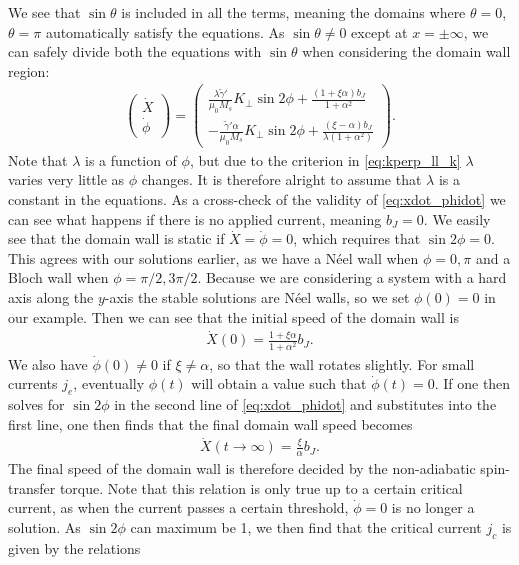\documentclass[12pt, a4paper]{article}		%
\numberwithin{equation}{section}
\begin{document}
We see that $\sin\theta$ is included in all the terms, meaning the domains where $\theta = 0$, $\theta = \pi$ automatically satisfy the equations. As $\sin\theta \neq 0$ except at $x = \pm \infty$, we can safely divide both the equations with $\sin\theta$ when considering the domain wall region:
\begin{align}
\label{eq:xdot_phidot}
\begin{pmatrix}
\dot{X} \\ \dot{\phi}
\end{pmatrix}
=
\begin{pmatrix}
\frac{\lambda \tilde{\gamma}'}{\mu_0 M_s} K_{\perp} \sin2\phi + \frac{(1+\xi\alpha)b_J}{1+\alpha^2} \\
-\frac{\tilde{\gamma}'\alpha}{\mu_0 M_s} K_{\perp} \sin2\phi + \frac{(\xi-\alpha)b_J}{\lambda(1+\alpha^2)}
\end{pmatrix}.
\end{align}
Note that $\lambda$ is a function of $\phi$, but due to the criterion in \eqref{eq:kperp_ll_k} $\lambda$ varies very little as $\phi$ changes. It is therefore alright to assume that $\lambda$ is a constant in the equations. As a cross-check of the validity of \eqref{eq:xdot_phidot} we can see what happens if there is no applied current, meaning $b_J = 0$. We easily see that the domain wall is static if $\dot{X} = \dot{\phi} = 0$, which requires that $\sin2\phi = 0$. This agrees with our solutions earlier, as we have a N\'{e}el wall when $\phi = 0, \pi$ and a Bloch wall when $\phi = \pi/2, 3\pi/2$. Because we are considering a system with a hard axis along the $y$-axis the stable solutions are N\'{e}el walls, so we set $\phi(0) = 0$ in our example. Then we can see that the initial speed of the domain wall is
\begin{align}
\label{eq:Xdot0}
\dot{X}(0) = \frac{1+\xi\alpha}{1+\alpha^2}b_J.
\end{align}
We also have $\dot{\phi}(0) \neq 0$ if $\xi \neq \alpha$, so that the wall rotates slightly. For small currents $j_e$, eventually $\phi(t)$ will obtain a value such that $\dot{\phi}(t) = 0$. If one then solves for $\sin2\phi$ in the second line of \eqref{eq:xdot_phidot} and substitutes into the first line, one then finds that the final domain wall speed becomes
\begin{align}
\label{eq:xdot_undercrit}
\dot{X}(t\rightarrow\infty) = \frac{\xi}{\alpha} b_J.
\end{align}
The final speed of the domain wall is therefore decided by the non-adiabatic spin-transfer torque. Note that this relation is only true up to a certain critical current, as when the current passes a certain threshold, $\dot{\phi} = 0$ is no longer a solution. As $\sin2\phi$ can maximum be 1, we then find that the critical current $j_c$ is given by the relations
\end{document}
